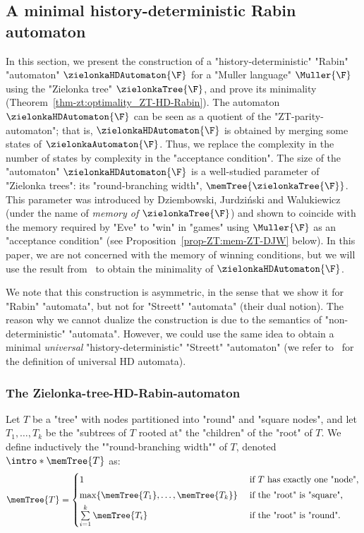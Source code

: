 \documentclass[10pt,a4paper]{amsart}
\begin{document}
\subsection{A minimal history-deterministic Rabin automaton}\label{subsec-zt: GFG-Rabin}
In this section, we present the construction of a "history-deterministic" "Rabin" "automaton" $\zielonkaHDAutomaton{\F}$ for a "Muller language" $\Muller{\F}$ using the "Zielonka tree" $\zielonkaTree{\F}$, and prove its minimality (Theorem~\ref{thm-zt:optimality_ZT-HD-Rabin}).
The automaton $\zielonkaHDAutomaton{\F}$ can be seen as a quotient of the "ZT-parity-automaton"; that is, $\zielonkaHDAutomaton{\F}$ is obtained by merging some states of $\zielonkaAutomaton{\F}$. Thus, we replace the complexity in the number of states by complexity in the "acceptance condition".
The size of the "automaton" $\zielonkaHDAutomaton{\F}$ is a well-studied parameter of "Zielonka trees": its "round-branching width", $\memTree{\zielonkaTree{\F}}$. This parameter was introduced by Dziembowski, Jurdziński and Walukiewicz~\cite{DJW1997memory} (under the name of \emph{memory of $\zielonkaTree{\F}$}) and shown to coincide with the memory required by "Eve" to "win" in "games" using $\Muller{\F}$ as an "acceptance condition" (see Proposition~\ref{prop-ZT:mem-ZT-DJW} below). In this paper, we are not concerned with the memory of winning conditions, but we will use the result from~\cite{DJW1997memory} to obtain the minimality of $\zielonkaHDAutomaton{\F}$.


We note that this construction is asymmetric, in the sense that we show it for "Rabin" "automata", but not for "Streett" "automata" (their dual notion). The reason why we cannot dualize the construction is due to the semantics of "non-deterministic" "automata". However, we could use the same idea to obtain a minimal \emph{universal} "history-deterministic" "Streett" "automaton" (we refer to~\cite{BL19GFGFromND} for the definition of universal HD automata).
	
	
\subsubsection{The Zielonka-tree-HD-Rabin-automaton}\label{subsubsec-zt-GFG: definition}
\begin{definition}
	Let $T$ be a "tree" with nodes partitioned into "round" and "square nodes", and let $T_1, \dots, T_k$ be the "subtrees of $T$ rooted at" the "children" of the "root" of $T$. 
	\AP We define inductively the ""round-branching width"" of $T$, denoted $\intro*\memTree{T}$ as:
	\begin{equation*}
		\memTree{T} =	\begin{cases}
			1 & \text{ if } T \text{ has exactly one "node",}\\[1mm]
			\max \{ \memTree{T_1}, \dots , \memTree{T_k}\} & \text{ if the "root" is "square",}\\[1mm]
			\sum\limits_{i=1}^k \memTree{T_i} & \text{ if the "root" is "round".}
		\end{cases}
	\end{equation*}
\end{definition}
\end{document}
